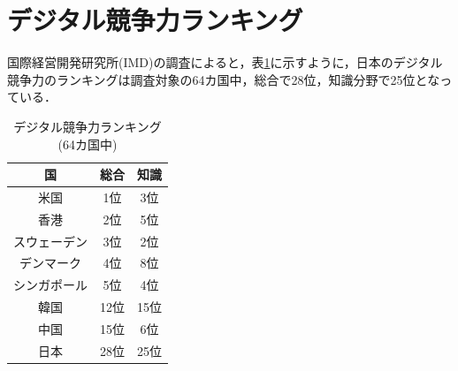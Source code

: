 \documentclass[a4paper,11pt,dvipdfmx]{ujarticle}
\begin{document}
\section{デジタル競争力ランキング}

国際経営開発研究所(IMD)の調査\cite{imd}によると，表\ref{tbl:tbl1}に示すように，日本のデジタル競争力のランキングは調査対象の64カ国中，総合で28位，知識分野で25位となっている．

\begin{table}[htbp]
    \centering
    \caption{デジタル競争力ランキング(64カ国中)}\label{tbl:tbl1}
    \begin{tabular}{|c|c|c|}\hline
        国 & 総合 & 知識 \\
        \hline
        米国 & 1位 & 3位 \\
        \hline
        香港 & 2位 & 5位 \\
        \hline
        スウェーデン & 3位 & 2位 \\
        \hline
        デンマーク & 4位 & 8位 \\
        \hline
        シンガポール & 5位 & 4位 \\
        \hline\hline
        韓国 & 12位 & 15位 \\
        \hline
        中国 & 15位 & 6位 \\
        \hline\hline
        日本 & 28位 & 25位 \\
        \hline
    \end{tabular}
\end{table}

%
\end{document}
